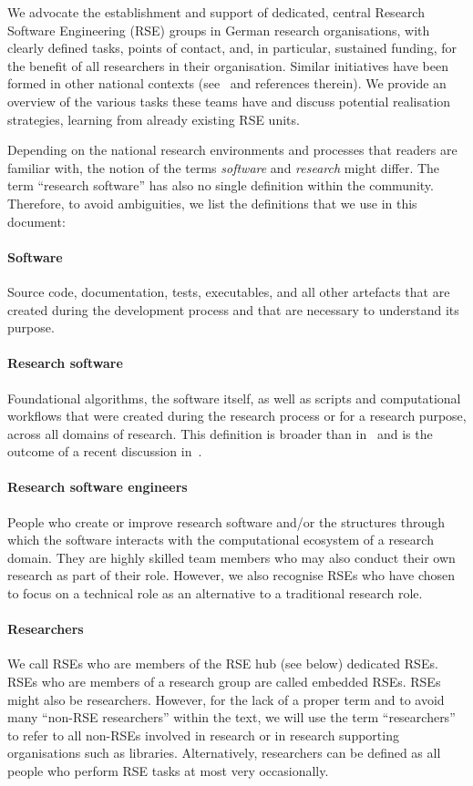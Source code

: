 \documentclass[a4paper]{article}
\begin{document}
We advocate the establishment and support of dedicated, central Research Software Engineering (RSE) groups in German research organisations, with clearly defined tasks, points of contact, and, in particular, sustained funding, for the benefit of all researchers in their organisation.
Similar initiatives have been formed in other national contexts (see~\autocite{barkerkatz2024,martin2023} and references therein).
We provide an overview of the various tasks these teams have and discuss potential realisation strategies, learning from already existing RSE units.

Depending on the national research environments and processes that readers are familiar with, the notion of the terms \emph{software} and \emph{research} might differ.
The term “research software” has also no single definition within the community.
Therefore, to avoid ambiguities, we list the definitions that we use in this document:
\paragraph{Software}
Source code, documentation, tests, executables, and all other artefacts that are created during the development process and that are necessary to understand its purpose.
\paragraph{Research software}
Foundational algorithms, the software itself, as well as scripts and computational workflows that were created during the research process or for a research purpose, across all domains of research.
This definition is broader than in~\autocite{FAIR4RS} and is the outcome of a recent discussion in~\autocite{Gruenpeter2021}.
\paragraph{Research software engineers}
People who create or improve research software and/or the structures through which the software interacts with the computational ecosystem of a research domain.
They are highly skilled team members who may also conduct their own research as part of their role.
However, we also recognise RSEs who have chosen to focus on a technical role as an alternative to a traditional research role.
\paragraph{Researchers}
We call RSEs who are members of the RSE hub (see below) dedicated RSEs.
RSEs who are members of a research group are called embedded RSEs.
RSEs might also be researchers.
However, for the lack of a proper term and to avoid many “non-RSE researchers” within the text, we will use the term “researchers” to refer to all non-RSEs involved in research or in research supporting organisations such as libraries.
Alternatively, researchers can be defined as all people who perform RSE tasks at most very occasionally.
\end{document}
